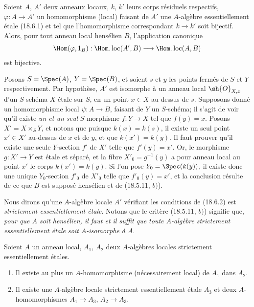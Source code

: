 \begin{lemma}[18.6.2]
Soient $A$, $A'$ deux anneaux locaux, $k$, $k'$ leurs corps résiduels respectifs, $\varphi:A\to A'$ un homomorphisme (local) faisant de $A'$ une $A$-algèbre essentiellement étale (18.6.1) et tel que l'homomorphisme correspondant $k\to k'$ soit bijectif. Alors, pour tout anneau local hensélien $B$, l'application canonique
\[
  \Hom(\varphi,1_B):\Hom.\operatorname{loc}(A',B)\longrightarrow\Hom.\operatorname{loc}(A,B)
\]
est bijective.
\end{lemma}

Posons $S=\Spec(A)$, $Y=\Spec(B)$, et soient $s$ et $y$ les points fermés de $S$ et $Y$ respectivement. Par hypothèse, $A'$ est isomorphe à un anneau local $\sh{O}_{X,x}$ d'un $S$-schéma $X$ étale sur $S$, en un point $x\in X$ au-dessus de $s$. Supposons donné un homomorphisme local $\psi:A\to B$, faisant de $Y$ un $S$-schéma; il s'agit de voir qu'il existe \emph{un et un seul} $S$-morphisme $f:Y\to X$ tel que $f(y)=x$. Posons $X'=X\times_S Y$, et notons que puisque $k(x)=k(s)$, il existe un seul point $x'\in X'$ au-dessus de $x$ et de $y$, et que $k(x')=k(y)$. Il faut prouver qu'il existe une seule $Y$-section $f'$ de $X'$ telle que $f'(y)=x'$. Or, le morphisme $g:X'\to Y$ est étale et séparé, et la fibre $X'_0=g^{-1}(y)$ a pour anneau local au point $x'$ le corps $k(x')=k(y)$. Si l'on pose $Y_0=\Spec(k(y))$, il existe donc une unique $Y_0$-section $f'_0$ de $X'_0$ telle que $f'_0(y)=x'$, et la conclusion résulte de ce que $B$ est supposé hensélien et de (18.5.11, $b)$).

Nous dirons qu'une $A$-algèbre locale $A'$ vérifiant les conditions de (18.6.2) est \emph{strictement essentiellement étale}. Notons que le critère (18.5.11, $b)$) signifie que, \emph{pour que $A$ soit hensélien, il faut et il suffit que toute $A$-algèbre strictement essentiellement étale soit $A$-isomorphe à $A$}.

\begin{lemma}[18.6.3]
\label{IV.18.6.3}
Soient $A$ un anneau local, $A_1$, $A_2$ deux $A$-algèbres locales strictement essentiellement étales.
\begin{enumerate}
  \item[(i)] Il existe au plus un $A$-homomorphisme (nécessairement local) de $A_1$ dans $A_2$.
  \item[(ii)] Il existe une $A$-algèbre locale strictement essentiellement étale $A_3$ et deux $A$-homomorphismes $A_1\to A_3$, $A_2\to A_3$.
\end{enumerate}
\end{lemma}

